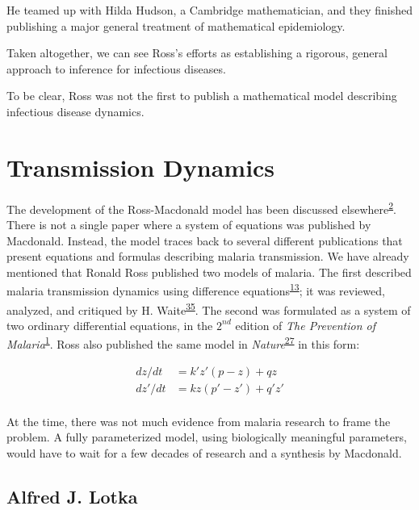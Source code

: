 \documentclass[
]{book}
\begin{document}
He teamed up with Hilda Hudson, a Cambridge mathematician, and they finished publishing a major general treatment of mathematical epidemiology.

Taken altogether, we can see Ross's efforts as establishing a rigorous, general approach to inference for infectious diseases.

To be clear, Ross was not the first to publish a mathematical model describing infectious disease dynamics.

\hypertarget{transmission-dynamics}{%
\section{Transmission Dynamics}\label{transmission-dynamics}}

The development of the Ross-Macdonald model has been discussed elsewhere\textsuperscript{\protect\hyperlink{ref-SmithDL2012_RossMacdonald}{2}}. There is not a single paper where a system of equations was published by Macdonald. Instead, the model traces back to several different publications that present equations and formulas describing malaria transmission. We have already mentioned that Ronald Ross published two models of malaria. The first described malaria transmission dynamics using difference equations\textsuperscript{\protect\hyperlink{ref-RossR1908}{13}}; it was reviewed, analyzed, and critiqued by H. Waite\textsuperscript{\protect\hyperlink{ref-WaiteH1910MosquitoesMalaria}{35}}. The second was formulated as a system of two ordinary differential equations, in the \(2^{nd}\) edition of \emph{The Prevention of Malaria}\textsuperscript{\protect\hyperlink{ref-RossR1911Book}{1}}. Ross also published the same model in \emph{Nature}\textsuperscript{\protect\hyperlink{ref-RossR1911Nature}{27}} in this form:

\[ 
\begin{array}{rl}
dz/dt &= k' z' (p-z) + q z \\
dz'/dt &= k z (p'-z') + q' z' \\
\end{array}
\]

At the time, there was not much evidence from malaria research to frame the problem. A fully parameterized model, using biologically meaningful parameters, would have to wait for a few decades of research and a synthesis by Macdonald.

\hypertarget{alfred-j.-lotka}{%
\subsection{Alfred J. Lotka}\label{alfred-j.-lotka}}
\end{document}
